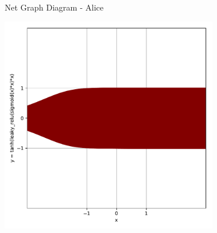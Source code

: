 \documentclass[a4paper, 12pt]{report}
\begin{document}
\begin{blockfigure}{ Net Graph Diagram - Alice}
	\begin{center}
		\includegraphics[width = 0.7\textwidth]{sigmoid_leakyRelu_tanh}
	\end{center}
\end{blockfigure}
\newpage
\end{document}

